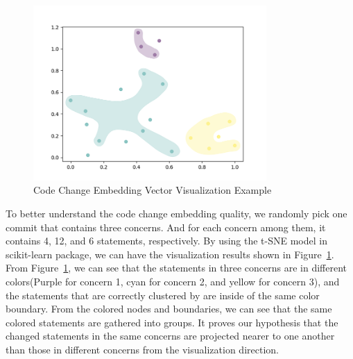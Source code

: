 

\begin{figure}[t]
	\centering
	\includegraphics[width=3.5in]{figures/RQ5.png}
	\vspace{-18pt}
	\caption{Code Change Embedding Vector Visualization Example}
	\label{fig:rq5}
\end{figure}

To better understand the code change embedding quality, we randomly pick one commit that contains three concerns. And for each concern among them, it contains 4, 12, and 6 statements, respectively. By using the t-SNE model \cite{} in scikit-learn \cite{} package, we can have the visualization results shown in Figure~\ref{fig:rq5}. From Figure~\ref{fig:rq5}, we can see that the statements in three concerns are in different colors(Purple for concern 1, cyan for concern 2, and yellow for concern 3), and the statements that are correctly clustered by \tool are inside of the same color boundary. From the colored nodes and boundaries, we can see that the same colored statements are gathered into groups. It proves our hypothesis that the changed statements in the same concerns are projected nearer to one another than those in different concerns from the visualization direction.
